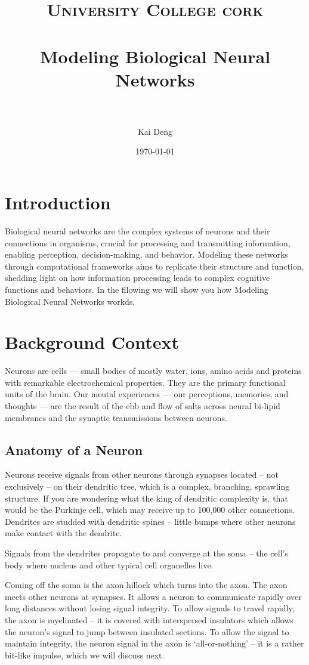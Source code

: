 \documentclass[paper=a4, fontsize=11pt]{scrartcl} %
\title{	
\normalfont \normalsize 
\textsc{University College cork} \\ [25pt] %
\horrule{0.5pt} \\[0.4cm] %
\huge Modeling Biological Neural Networks \\ %
\horrule{2pt} \\[0.5cm] %
}
\author{Kai Deng} %
\date{\normalsize\today} %
\numberwithin{equation}{section} %
\numberwithin{figure}{section} %
\numberwithin{table}{section} %
\begin{document}
\maketitle %

\tableofcontents
\clearpage

\section{Introduction}
Biological neural networks are the complex systems of neurons and their connections in organisms, crucial for processing and transmitting information, enabling perception, decision-making, and behavior. Modeling these networks through computational frameworks aims to replicate their structure and function, shedding light on how information processing leads to complex cognitive functions and behaviors. 
In the fllowing we will show you how Modeling Biological Neural Networks workds.


\section{Background Context}
Neurons are cells — small bodies of mostly water, ions, amino acids and proteins with remarkable electrochemical properties. They are the primary functional units of the brain. Our mental experiences — our perceptions, memories, and thoughts — are the result of the ebb and flow of salts across neural bi-lipid membranes and the synaptic transmissions between neurons. 

\subsection{Anatomy of a Neuron}
Neurons receive signals from other neurons through synapses located – not exclusively – on their dendritic tree, which is a complex, branching, sprawling structure. If you are wondering what the king of dendritic complexity is, that would be the Purkinje cell, which may receive up to 100,000 other connections. Dendrites are studded with dendritic spines – little bumps where other neurons make contact with the dendrite.

\vspace{10pt}
Signals from the dendrites propagate to and converge at the soma – the cell’s body where nucleus and other typical cell organelles live.

\vspace{10pt}
Coming off the soma is the axon hillock which turns into the axon. The axon meets other neurons at synapses. It allows a neuron to communicate rapidly over long distances without losing signal integrity. To allow signals to travel rapidly, the axon is myelinated – it is covered with interspersed insulators which allows the neuron’s signal to jump between insulated sections. To allow the signal to maintain integrity, the neuron signal in the axon is ‘all-or-nothing’ – it is a rather bit-like impulse, which we will discuss next.
\end{document}
